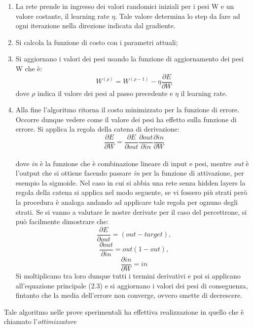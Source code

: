\begin{enumerate}
\item La rete prende in ingresso dei valori randomici iniziali per i pesi W e un valore costante,
 il learning rate \(\eta\). Tale valore determina lo step da fare ad 
 ogni iterazione nella direzione indicata dal gradiente. 
\item Si calcola la funzione di costo con i parametri attuali;
\item Si aggiornano i valori dei pesi usando la funzione di aggiornamento dei pesi W che è:
 \begin{equation} \label{3}
W^{(\rho)} = W^{(\rho -1)} - \eta \frac{\partial E}{\partial W}
\end{equation}
dove \(\rho\) indica il valore dei pesi al passo precedente e \(\eta\) il learning rate.
\item Alla fine l'algoritmo ritorna il costo minimizzato per la funzione di errore. \\

Occorre dunque vedere come il valore dei pesi ha effetto sulla funzione di errore.
 Si applica la regola della catena di derivazione:\\

\[\frac{\partial E}{\partial W}  = \frac{\partial E}{\partial out}  \frac{\partial out}{\partial in}  \frac{\partial in}{\partial W} \] \\

dove \emph{in} è la funzione che è combinazione lineare di input e pesi, 
mentre \emph{out} è l’output che si ottiene facendo passare \emph{in} per la funzione di attivazione,
 per esempio la sigmoide.
Nel caso in cui si abbia una rete senza hidden layers la regola della catena si applica nel modo seguente, 
se vi fossero più strati però la procedura è analoga andando ad applicare tale regola
 per ognuno degli strati. 
Se si vanno a valutare le nostre derivate per il caso del percettrone, si può facilmente dimostrare che:\\
\[\frac{\partial E}{\partial out} = (out - target),\]
\[\frac{\partial out}{\partial in} = out(1-out),\]
\[\frac{\partial in}{\partial W} = in \]
Si moltiplicano tra loro dunque tutti i termini derivativi e poi si applicano all’equazione principale (2.3) 
e si aggiornano i valori dei pesi di conseguenza, fintanto che la media dell’errore non converge, ovvero smette
 di decrescere. 
\end{enumerate}
Tale algoritmo nelle prove sperimentali ha effettiva realizzazione in quello che è chiamato l’\emph{ottimizzatore}
